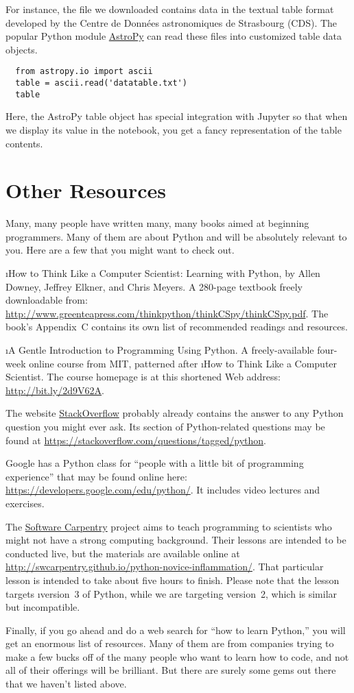 \documentclass[letterpaper, 12pt, titlepage, twoside]{article}
\begin{document}
For instance, the file we downloaded contains data in the textual table format
developed by the Centre de Données astronomiques de Strasbourg (CDS). The
popular Python module \href{http://www.astropy.org/}{AstroPy} can read these
files into customized table data objects.

\begin{lstlisting}
  from astropy.io import ascii
  table = ascii.read('datatable.txt')
  table
\end{lstlisting}

Here, the AstroPy table object has special integration with Jupyter so that
when we display its value in the notebook, you get a fancy representation of
the table contents.




\newpage
\section*{Other Resources}

Many, many people have written many, many books aimed at beginning
programmers. Many of them are about Python and will be absolutely relevant to
you. Here are a few that you might want to check out.

\i{How to Think Like a Computer Scientist: Learning with Python}, by Allen
Downey, Jeffrey Elkner, and Chris Meyers. A 280-page textbook freely
downloadable from:
\url{http://www.greenteapress.com/thinkpython/thinkCSpy/thinkCSpy.pdf}. The
book's Appendix~C contains its own list of recommended readings and resources.

\i{A Gentle Introduction to Programming Using Python}. A freely-available
four-week online course from MIT, patterned after \i{How to Think Like a
  Computer Scientist}. The course homepage is at this shortened Web address:
\url{http://bit.ly/2d9V62A}.

The website \href{https://stackoverflow.com/}{StackOverflow} probably already
contains the answer to any Python question you might ever ask. Its section of
Python-related questions may be found at
\url{https://stackoverflow.com/questions/tagged/python}.

Google has a Python class for ``people with a little bit of programming
experience'' that may be found online here:
\url{https://developers.google.com/edu/python/}. It includes video lectures
and exercises.

The \href{https://software-carpentry.org/}{Software Carpentry} project aims to
teach programming to scientists who might not have a strong computing
background. Their lessons are intended to be conducted live, but the materials
are available online at
\url{http://swcarpentry.github.io/python-novice-inflammation/}. That
particular lesson is intended to take about five hours to finish. Please note
that the lesson targets \i{version~3} of Python, while we are targeting
version~2, which is similar but incompatible.

Finally, if you go ahead and do a web search for ``how to learn Python,'' you
will get an enormous list of resources. Many of them are from companies trying
to make a few bucks off of the many people who want to learn how to code, and
not all of their offerings will be brilliant. But there are surely some gems
out there that we haven't listed above.
\end{document}
